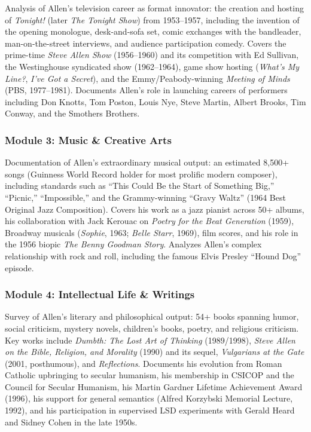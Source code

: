\documentclass[11pt,letterpaper]{article}
\begin{document}
Analysis of Allen's television career as format innovator: the creation and hosting of \textit{Tonight!} (later \textit{The Tonight Show}) from 1953--1957, including the invention of the opening monologue, desk-and-sofa set, comic exchanges with the bandleader, man-on-the-street interviews, and audience participation comedy. Covers the prime-time \textit{Steve Allen Show} (1956--1960) and its competition with Ed Sullivan, the Westinghouse syndicated show (1962--1964), game show hosting (\textit{What's My Line?}, \textit{I've Got a Secret}), and the Emmy/Peabody-winning \textit{Meeting of Minds} (PBS, 1977--1981). Documents Allen's role in launching careers of performers including Don Knotts, Tom Poston, Louis Nye, Steve Martin, Albert Brooks, Tim Conway, and the Smothers Brothers.

\subsubsection{Module 3: Music \& Creative Arts}

Documentation of Allen's extraordinary musical output: an estimated 8,500+ songs (Guinness World Record holder for most prolific modern composer), including standards such as ``This Could Be the Start of Something Big,'' ``Picnic,'' ``Impossible,'' and the Grammy-winning ``Gravy Waltz'' (1964 Best Original Jazz Composition). Covers his work as a jazz pianist across 50+ albums, his collaboration with Jack Kerouac on \textit{Poetry for the Beat Generation} (1959), Broadway musicals (\textit{Sophie}, 1963; \textit{Belle Starr}, 1969), film scores, and his role in the 1956 biopic \textit{The Benny Goodman Story}. Analyzes Allen's complex relationship with rock and roll, including the famous Elvis Presley ``Hound Dog'' episode.

\subsubsection{Module 4: Intellectual Life \& Writings}

Survey of Allen's literary and philosophical output: 54+ books spanning humor, social criticism, mystery novels, children's books, poetry, and religious criticism. Key works include \textit{Dumbth: The Lost Art of Thinking} (1989/1998), \textit{Steve Allen on the Bible, Religion, and Morality} (1990) and its sequel, \textit{Vulgarians at the Gate} (2001, posthumous), and \textit{Reflections}. Documents his evolution from Roman Catholic upbringing to secular humanism, his membership in CSICOP and the Council for Secular Humanism, his Martin Gardner Lifetime Achievement Award (1996), his support for general semantics (Alfred Korzybski Memorial Lecture, 1992), and his participation in supervised LSD experiments with Gerald Heard and Sidney Cohen in the late 1950s.
\end{document}
